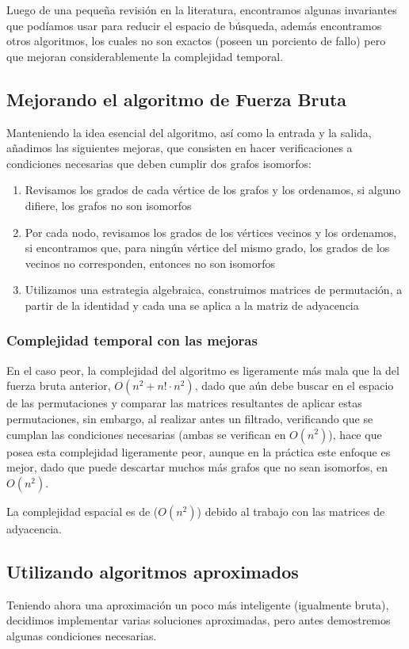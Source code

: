 \documentclass{article}
\begin{document}
Luego de una pequeña revisión en la literatura, encontramos algunas invariantes que podíamos usar para reducir el espacio de búsqueda, además encontramos otros algoritmos, los cuales no son exactos (poseen un porciento de fallo) pero que mejoran considerablemente la complejidad temporal.

\subsection{Mejorando el algoritmo de Fuerza Bruta}
Manteniendo la idea esencial del algoritmo, así como la entrada y la salida, añadimos las siguientes mejoras, que consisten en hacer verificaciones a condiciones necesarias que deben cumplir dos grafos isomorfos:

\begin{enumerate}
\item {Revisamos los grados de cada vértice de los grafos y los ordenamos, si alguno difiere, los grafos no son isomorfos}
\item {Por cada nodo, revisamos los grados de los vértices vecinos y los ordenamos, si encontramos que, para ningún vértice del mismo grado, los grados de los vecinos no corresponden, entonces no son isomorfos}
\item{Utilizamos una estrategia algebraica, construimos matrices de permutación, a partir de la identidad y cada una se aplica a la matriz de adyacencia}
\end{enumerate}
\subsubsection*{Complejidad temporal con las mejoras}
En el caso peor, la complejidad del algoritmo es ligeramente más mala que la del fuerza bruta anterior, $O(n^2 + n! \cdot n^2)$, dado que aún debe buscar en el espacio de las permutaciones y comparar las matrices resultantes de aplicar estas permutaciones, sin embargo, al realizar antes un filtrado, verificando que se cumplan las condiciones necesarias (ambas se verifican en $O(n^2)$), hace que posea esta complejidad ligeramente peor, aunque en la práctica este enfoque es mejor, dado que puede descartar muchos más grafos que no sean isomorfos, en $O(n^2)$.

La complejidad espacial es de ($O(n^2)$) debido al trabajo con las matrices de adyacencia.

\subsection{Utilizando algoritmos aproximados}
Teniendo ahora una aproximación un poco más inteligente (igualmente bruta), decidimos implementar varias soluciones aproximadas, pero antes demostremos algunas condiciones necesarias.
\end{document}
